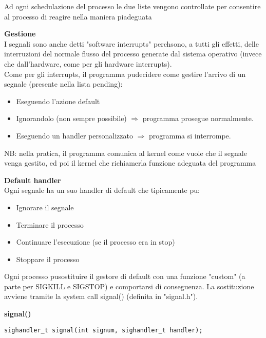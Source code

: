 \begin{flushleft}
\begin{itemize}
  \end{itemize}
  Ad ogni schedulazione del processo le due liste vengono controllate per consentire al 
  processo di reagire nella maniera pi\acu adeguata\par 
  \begin{flushleft}
    \textbf{Gestione}\\
    I segnali sono anche detti "software interrupts" perch\ace sono, a tutti gli effetti, delle 
    interruzioni del normale flusso del processo generate dal sistema operativo (invece 
    che dall'hardware, come per gli hardware interrupts).\\
    Come per gli interrupts, il programma pu\aco decidere come gestire l'arrivo di un 
    segnale (presente nella lista pending):
    \begin{itemize}
      \item Eseguendo l'azione default
      \item Ignorandolo (non sempre possibile) $\Rightarrow$ programma prosegue normalmente.
      \item Eseguendo un handler personalizzato $\Rightarrow$ programma si interrompe.
    \end{itemize}
    NB: nella pratica, il programma comunica al kernel come vuole che il segnale venga 
    gestito, ed \ace poi il kernel che richiamer\aca la funzione adeguata del programma
  \end{flushleft}
  \begin{flushleft}
    \textbf{Default handler}\\
    Ogni segnale ha un suo handler di default che tipicamente pu\aco:
    \begin{itemize}
      \item Ignorare il segnale
      \item Terminare il processo
      \item Continuare l'esecuzione (se il processo era in stop)
      \item Stoppare il processo
    \end{itemize}
    Ogni processo pu\aco sostituire il gestore di default con una funzione "custom" (a parte 
    per SIGKILL e SIGSTOP) e comportarsi di conseguenza. La sostituzione avviene 
    tramite la system call signal() (definita in "signal.h").
  \end{flushleft}
  \begin{flushleft}
    \textbf{signal()}\par 
    \texttt{sighandler\_t signal(int signum, sighandler\_t handler);}\\

\end{flushleft}
\end{flushleft}
